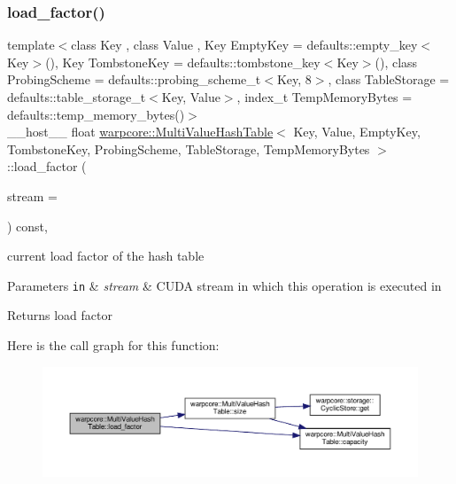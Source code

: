 \subsubsection{\texorpdfstring{load\+\_\+factor()}{load\_factor()}}
{\footnotesize\ttfamily template$<$class Key , class Value , Key Empty\+Key = defaults\+::empty\+\_\+key$<$\+Key$>$(), Key Tombstone\+Key = defaults\+::tombstone\+\_\+key$<$\+Key$>$(), class Probing\+Scheme  = defaults\+::probing\+\_\+scheme\+\_\+t$<$\+Key, 8$>$, class Table\+Storage  = defaults\+::table\+\_\+storage\+\_\+t$<$\+Key, Value$>$, index\+\_\+t Temp\+Memory\+Bytes = defaults\+::temp\+\_\+memory\+\_\+bytes()$>$ \\
\+\_\+\+\_\+host\+\_\+\+\_\+ float \hyperlink{classwarpcore_1_1MultiValueHashTable}{warpcore\+::\+Multi\+Value\+Hash\+Table}$<$ Key, Value, Empty\+Key, Tombstone\+Key, Probing\+Scheme, Table\+Storage, Temp\+Memory\+Bytes $>$\+::load\+\_\+factor (\begin{DoxyParamCaption}\item[{const cuda\+Stream\+\_\+t}]{stream = {} }\end{DoxyParamCaption}) const\hspace{0.3cm}{\ttfamily [inline]}, {\ttfamily [noexcept]}}



current load factor of the hash table 


\begin{DoxyParams}[1]{Parameters}
\mbox{\tt in}  & {\em stream} & C\+U\+DA stream in which this operation is executed in \\
\hline
\end{DoxyParams}
\begin{DoxyReturn}{Returns}
load factor 
\end{DoxyReturn}
Here is the call graph for this function\+:
\nopagebreak
\begin{figure}[H]
\begin{center}
\leavevmode
\includegraphics[width=350pt]{classwarpcore_1_1MultiValueHashTable_a8abd31b493048670295af663d50d1c9e_cgraph}
\end{center}
\end{figure}
\mbox{\label{classwarpcore_1_1MultiValueHashTable_aec537b17501127cd2bb44f60b90aecfa}} 
